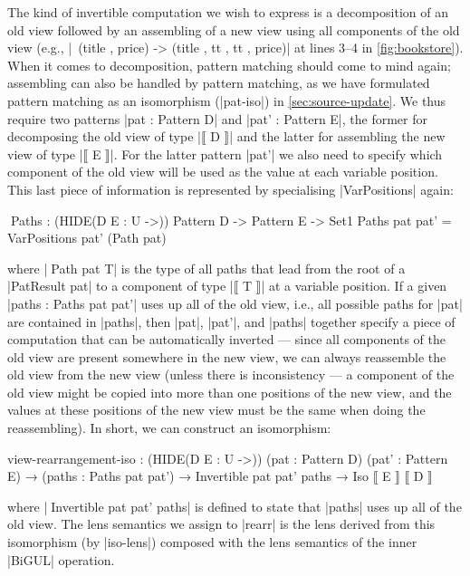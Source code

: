 \documentclass[fleqn]{llncs}
\begin{document}
The kind of invertible computation we wish to express is a decomposition of an old view followed by an assembling of a new view using all components of the old view (e.g., |\ (title , price) -> (title , tt , tt , price)| at lines 3--4 in \autoref{fig:bookstore}).
When it comes to decomposition, pattern matching should come to mind again; assembling can also be handled by pattern matching, as we have formulated pattern matching as an isomorphism (|pat-iso|) in \autoref{sec:source-update}.
We thus require two patterns |pat : Pattern D| and |pat' : Pattern E|, the former for decomposing the old view of type |⟦ D ⟧| and the latter for assembling the new view of type |⟦ E ⟧|.
For the latter pattern |pat'| we also need to specify which component of the old view will be used as the value at each variable position.
This last piece of information is represented by specialising |VarPositions| again:
\begin{code}
^^^Paths : (HIDE({D E : U} ->)) Pattern D -> Pattern E -> Set1
Paths pat pat' = VarPositions pat' (Path pat)
\end{code}
where |^^^Path pat T| is the type of all paths that lead from the root of a |PatResult pat| to a component of type |⟦ T ⟧| at a variable position.
If a given |paths : Paths pat pat'| uses up all of the old view, i.e., all possible paths for |pat| are contained in |paths|, then |pat|, |pat'|, and |paths| together specify a piece of computation that can be automatically inverted --- since all components of the old view are present somewhere in the new view, we can always reassemble the old view from the new view (unless there is inconsistency --- a component of the old view might be copied into more than one positions of the new view, and the values at these positions of the new view must be the same when doing the reassembling).
In short, we can construct an isomorphism:
\begin{code}
view-rearrangement-iso : (HIDE({D E : U} ->))
  (pat : Pattern D) (pat' : Pattern E) →
  (paths : Paths pat pat') → Invertible pat pat' paths → Iso ⟦ E ⟧ ⟦ D ⟧
\end{code}
where |^^^Invertible pat pat' paths| is defined to state that |paths| uses up all of the old view.
The lens semantics we assign to |rearr| is the lens derived from this isomorphism (by |iso-lens|) composed with the lens semantics of the inner |BiGUL| operation.
\end{document}
